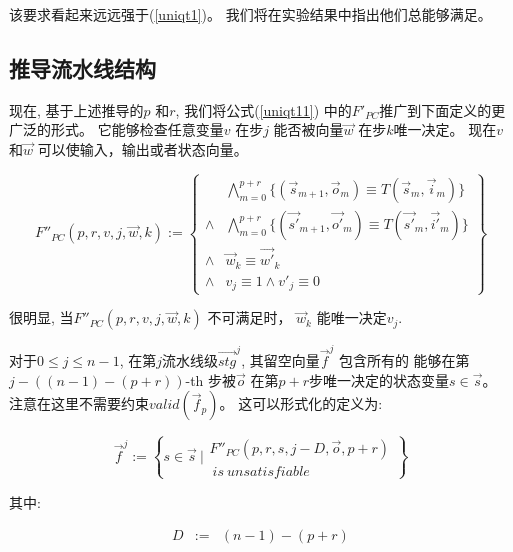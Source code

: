 该要求看起来远远强于(\ref{uniqt1})。
我们将在实验结果中指出他们总能够满足。



\subsection{推导流水线结构}\label{subsec_inferstage}

现在,
基于上述推导的$p$ 和$r$,
我们将公式(\ref{uniqt11}) 中的$F'_{PC}$推广到下面定义的更广泛的形式。
它能够检查任意变量$v$ 在步$j$
能否被向量$\vec{w}$ 在步$k$唯一决定。
现在$v$ 和$\vec{w}$ 可以使输入，输出或者状态向量。

\begin{equation}\label{uniqt2}
F''_{PC}(p,r,v,j,\vec{w},k):=
\left\{
\begin{array}{cc}
&\bigwedge_{m=0}^{p+r}
\{
(\vec{s}_{m+1},\vec{o}_m)\equiv T(\vec{s}_m,\vec{i}_m)
\}
\\
\wedge&\bigwedge_{m=0}^{p+r}
\{
(\vec{s'}_{m+1},\vec{o'}_m)\equiv T(\vec{s'}_m,\vec{i'}_m)
\}
\\
\wedge&\vec{w}_{k}\equiv \vec{w'}_{k} \\
\wedge& v_{j}\equiv 1 \wedge  v'_{j}\equiv 0
\end{array}
\right\}
\end{equation}

很明显,
当$F''_{PC}(p,r,v,j,\vec{w},k)$ 不可满足时，
$\vec{w}_k$ 能唯一决定$v_j$.

对于$0\le j\le n-1$,
在第$j$流水线级$\vec{stg}^j$,
其留空向量$\vec{f}^j$ 包含所有的
能够在第$j-((n-1)-(p+r))$-th 步被$\vec{o}$
在第$p+r$步唯一决定的状态变量$s\in \vec{s}$。
注意在这里不需要约束$valid(\vec{f}_p)$。
这可以形式化的定义为:

\begin{equation}\label{stgn_fj}
\vec{f}^{j} :=
 \left\{
 s\in \vec{s} ~|
\begin{array}{cc}
 F''_{PC}(p,r,s,j-D,\vec{o},p+r)\\
 ~is~unsatisfiable
\end{array}
\right\}
\end{equation}

其中:

\begin{equation}\label{stgn_def}
\begin{array}{ccc}
D             & := & (n-1)-(p+r)\\
\end{array}
\end{equation}

